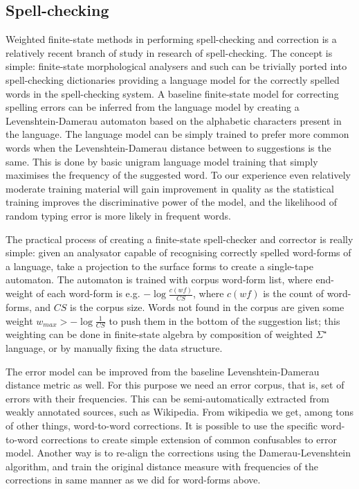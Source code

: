 \documentclass{llncs}
\begin{document}
\subsection{Spell-checking}

Weighted finite-state methods in performing spell-checking and correction is a
relatively recent branch of study in research of spell-checking. The concept is
simple: finite-state morphological analysers and such can be trivially ported
into spell-checking dictionaries providing a language model for the correctly
spelled words in the spell-checking system. A baseline finite-state model for
correcting spelling errors can be inferred from the language model by creating
a Levenshtein-Damerau automaton based on the alphabetic characters present in
the language. The language model can be simply trained to prefer more common
words when the Levenshtein-Damerau distance between to suggestions is the same.
This is done by basic unigram language model training that simply maximises
the frequency of the suggested word. To our experience even relatively moderate
training material will gain improvement in quality as the statistical training
improves the discriminative power of the model, and the likelihood of random
typing error is more likely in frequent words.

The practical process of creating a finite-state spell-checker and corrector
is really simple: given an analysator capable of recognising correctly spelled
word-forms of a language, take a projection to the surface forms to create a
single-tape automaton. The automaton is trained with corpus word-form list, 
where end-weight of each word-form is e.g. $-\log\frac{c(wf)}{CS}$, where 
$c(wf)$ is the count of word-forms, and $CS$ is the corpus size. Words not
found in the corpus are given some weight $w_{max} > -\log\frac{1}{CS}$ to
push them in the bottom of the suggestion list; this weighting can be done
in finite-state algebra by composition of weighted $\Sigma^{\star}$ language,
or by manually fixing the data structure.

The error model can be improved from the baseline Levenshtein-Damerau distance
metric as well. For this purpose we need an error corpus, that is, set of
errors with their frequencies. This can be semi-automatically extracted from
weakly annotated sources, such as Wikipedia. From wikipedia we get, among tons
of other things, word-to-word corrections. It is possible to use the specific
word-to-word corrections to create simple extension of common confusables to
error model. Another way is to re-align the corrections using the
Damerau-Levenshtein algorithm, and train the original distance measure with
frequencies of the corrections in same manner as we did for word-forms above.
\end{document}

